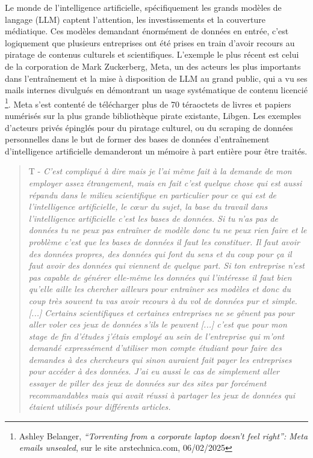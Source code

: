 Le monde de l'intelligence artificielle, spécifiquement les grands modèles de langage (LLM) captent l'attention, les investissements et la couverture médiatique. Ces modèles demandant énormément de données en entrée, c'est logiquement que plusieurs entreprises ont été prises en train d'avoir recours au piratage de contenus culturels et scientifiques. L'exemple le plus récent est celui de la corporation de Mark Zuckerberg, Meta, un des acteurs les plus importants dans l’entraînement et la mise à disposition de LLM au grand public, qui a vu ses mails internes divulgués en démontrant un usage systématique de contenu licencié \footnote{Ashley Belanger, \textit{“Torrenting from a corporate laptop doesn’t feel right”: Meta emails unsealed}, sur le site arstechnica.com, 06/02/2025}. Meta s'est contenté de télécharger plus de 70 téraoctets de livres et papiers numérisés sur la plus grande bibliothèque pirate existante, Libgen. Les exemples d'acteurs privés épinglés pour du piratage culturel, ou du scraping de données personnelles dans le but de former des bases de données d’entraînement d'intelligence artificielle demanderont un mémoire à part entière pour être traités. 

\begin{quote}
    T - \textit{C'est compliqué à dire mais je l'ai même fait à la demande de mon employer assez étrangement, mais en fait c'est quelque chose qui est aussi répandu dans le milieu scientifique en particulier pour ce qui est de l'intelligence artificielle, le cœur du sujet, la base du travail dans l'intelligence artificielle c'est les bases de données. Si tu n'as pas de données tu ne peux pas entraîner de modèle donc tu ne peux rien faire et le problème c'est que les bases de données il faut les constituer. Il faut avoir des données propres, des données qui font du sens et du coup pour ça il faut avoir des données qui viennent de quelque part. Si ton entreprise n'est pas capable de générer elle-même les données qui l’intéresse il faut bien qu'elle aille les chercher ailleurs pour entraîner ses modèles et donc du coup très souvent tu vas avoir recours à du vol de données pur et simple. [...] Certains scientifiques et certaines entreprises ne se gênent pas pour aller voler ces jeux de données s'ils le peuvent [...] c'est que pour mon stage de fin d'études j'étais employé au sein de l'entreprise qui m'ont demandé expressément d'utiliser mon compte étudiant pour faire des demandes à des chercheurs qui sinon auraient fait payer les entreprises pour accéder à des données. J'ai eu aussi le cas de simplement aller essayer de piller des jeux de données sur des sites par forcément recommandables mais qui avait réussi à partager les jeux de données qui étaient utilisés pour différents articles.}
\end{quote}

